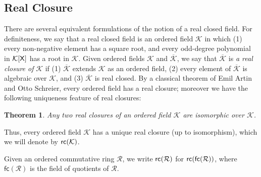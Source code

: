 \documentclass{amsart}
\newtheorem{theorem}{Theorem}[section]
\newcommand{\mc}[1]{\mathcal #1}
\newcommand{\X}{{\sf X}}
\begin{document}
\subsection{Real Closure}\label{realsmurf} There are several equivalent formulations of the notion of a real closed field. For definiteness, we say that a real closed field is an ordered field $\mc K$ in which (1) every non-negative element has a square root, and every odd-degree polynomial in $\mc K[\X]$ has a root in $\mc K$. Given ordered fields $\mc K$ and $\overline{\mc K}$, 
we say that $\overline{\mc K}$ is \emph{a real closure of} $\mc  K$ if (1) $\overline{\mc K}$  extends $\mc K$ 
as an ordered field, (2) every element of $\overline{\mc K}$ is algebraic over $\mc K$, and 
(3) $\overline{\mc K}$ is real closed. By a classical theorem of Emil Artin and Otto Schreier, every ordered field has a real closure; moreover we have the following uniqueness feature of real closures:

\begin{theorem} \label{rc_is_unique} \cite[Theorem 2.9, Chapter XI]{lang:algebra2002} Any two real closures of an ordered field $\mc K$ are isomorphic over $\mc K$. 
\end{theorem}

Thus, every ordered field $\mc K$ has a unique real closure (up to isomorphism), which we will denote by ${\sf rc}(\mc K)$. 

Given an ordered commutative ring $\mc R$, we write ${\sf rc}(\mc R)$ for ${\sf rc}(\mathsf{fc}(\mc R))$, 
where $\mathsf{fc}(\mc R)$ is the field of quotients of $\mc R$. 
\end{document}
